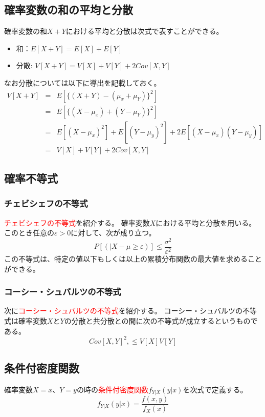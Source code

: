 \documentclass[a4paper,10pt]{jarticle}
\begin{document}
\subsection{確率変数の和の平均と分散}
確率変数の和$X+Y$における平均と分散は次式で表すことができる。
\begin{itemize}
    \item 和：$E[X+Y] = E[X]+E[Y]$
    \item 分散: $V[X+Y] = V[X]+V[Y] + 2Cov[X,Y]$
\end{itemize}
なお分散については以下に導出を記載しておく。
\begin{eqnarray*}
    V[X+Y] &=& E[\{(X+Y)-(\mu_x+\mu_Y)\}^2]\\
            &=& E[\{(X-\mu_x)+(Y-\mu_Y)\}^2]\\
            &=& E[(X-\mu_x)^2]+E[(Y-\mu_y)^2]+2E[(X-\mu_x)(Y-\mu_y)]\\
            &=& V[X]+V[Y]+2Cov[X,Y]
\end{eqnarray*}
\subsection{確率不等式}
\subsubsection{チェビシェフの不等式}
\textcolor{red}{チェビシェフの不等式}を紹介する。
確率変数$X$における平均と分散を用いる。このとき任意の$\varepsilon >0$に対して、次が成り立つ。
\begin{equation}
    P[(|X-\mu\geq\varepsilon)]\leq \frac{\sigma^2}{\varepsilon^2}\tag{2,20}
\end{equation}
この不等式は、特定の値以下もしくは以上の累積分布関数の最大値を求めることができる。
\subsubsection{コーシー・シュバルツの不等式}
次に\textcolor{red}{コーシー・シュバルツの不等式}を紹介する。
コーシー・シュバルツの不等式は確率変数$X$と$Y$の分散と共分散との間に次の不等式が成立するというものである。
\begin{equation}
    Cov[X,Y] ^2,\leq V[X]V[Y]\tag{2,21}
\end{equation}
\subsection{条件付密度関数}
確率変数$X=x$、$Y=y$の時の\textcolor{red}{条件付密度関数}$f_{Y|X}(y|x)$を次式で定義する。
\begin{equation}
    f_{Y|X}(y|x)=\frac{f(x,y)}{f_X(x)}\tag{2,22}
\end{equation}
\end{document}
